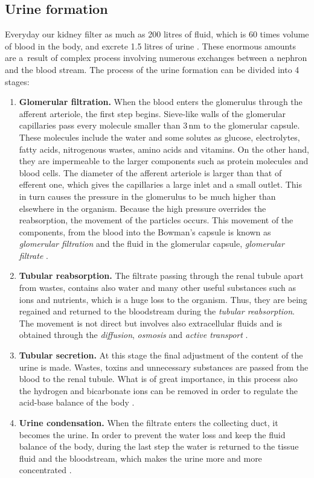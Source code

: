 \subsection{Urine formation} 
Everyday our kidney filter as much as 200 litres of fluid, which is 60 times volume of blood in the body, and excrete 1.5 litres of urine \cite{saladin}. These enormous amounts are a~result of complex process involving numerous exchanges between a nephron and the blood stream. The process of the urine formation can be divided into 4 stages:
\begin{enumerate}
\item{\textbf{Glomerular filtration.}} When the blood enters the glomerulus through the afferent arteriole, the first step begins. Sieve-like walls of the glomerular capillaries  pass every molecule smaller than 3\,nm to the glomerular capsule. These molecules include the water and some solutes as glucose, electrolytes, fatty acids, nitrogenous wastes, amino acids and vitamins. On the other hand, they are impermeable to the larger components such as protein molecules and blood cells.  The diameter of the afferent arteriole is larger than that of efferent one, which gives the capillaries a large inlet and a small outlet. This in turn causes the pressure in the glomerulus to be much higher than elsewhere in the organism. Because the high pressure overrides the reabsorption, the movement of the particles occurs. This movement  of  the components, from  the  blood  into  the Bowman's capsule is known as \textit{glomerular filtration} and the fluid in the glomerular capsule, \textit{glomerular filtrate} \cite{saladin, health_and_disease}.

  
\item{\textbf{Tubular reabsorption.}} The filtrate passing through the renal tubule apart from wastes, contains  also water and many other useful substances such as ions and nutrients, which is a huge loss to the organism. Thus, they are being regained and returned to the bloodstream during the \textit{tubular reabsorption}. The movement is not direct but involves also extracellular fluids and is obtained through the \textit{diffusion}, \textit{osmosis} and \textit{active transport} \cite{health_and_disease}.
 
\item{\textbf{Tubular secretion.}} At this stage the final adjustment of the content of the urine is made. Wastes, toxins and unnecessary substances are passed from the blood to the renal tubule. What is of great importance, in this process also the hydrogen and bicarbonate ions can be removed in order to regulate the acid-base balance of the body \cite{health_and_disease}.

\item{\textbf{Urine condensation.}} When the filtrate enters the collecting duct, it becomes the urine. In order to prevent the water loss and keep the fluid balance of the body, during the last step the water is returned to the tissue fluid and the bloodstream, which makes the urine more and more concentrated \cite{saladin}.

\end{enumerate}
